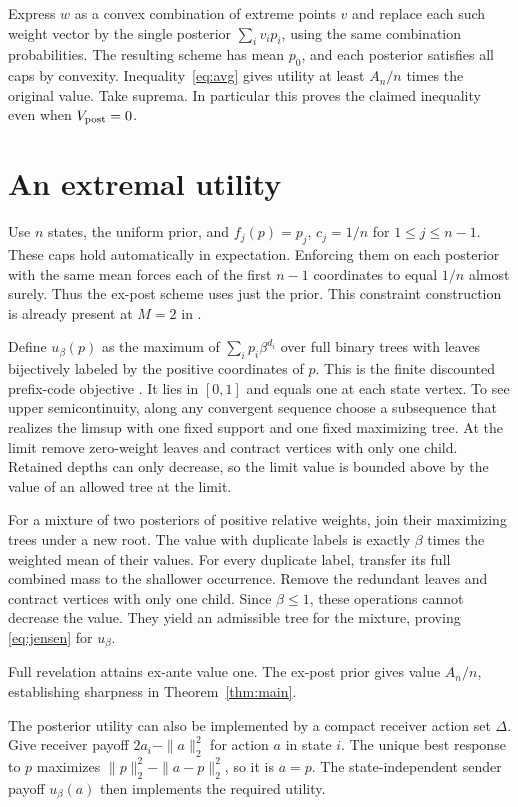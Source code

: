 \documentclass[11pt,a4paper]{amsart}
\begin{document}
Express \(w\) as a convex combination of extreme points \(v\) and replace each such weight vector by the single posterior \(\sum_i v_i p_i\), using the same combination probabilities. The resulting scheme has mean \(p_0\), and each posterior satisfies all caps by convexity. Inequality~\eqref{eq:avg} gives utility at least \(A_n/n\) times the original value. Take suprema. In particular this proves the claimed inequality even when \(V_{\rm post}=0\).

\section{An extremal utility}

Use \(n\) states, the uniform prior, and \(f_j(p)=p_j\), \(c_j=1/n\) for \(1\le j\le n-1\). These caps hold automatically in expectation. Enforcing them on each posterior with the same mean forces each of the first \(n-1\) coordinates to equal \(1/n\) almost surely. Thus the ex-post scheme uses just the prior. This constraint construction is already present at \(M=2\) in \cite[Prop.~5.5 and App.~E]{btzlong}.

Define \(u_\beta(p)\) as the maximum of \(\sum_i p_i\beta^{d_i}\) over full binary trees with leaves bijectively labeled by the positive coordinates of \(p\). This is the finite discounted prefix-code objective \cite{baer,parker}. It lies in \([0,1]\) and equals one at each state vertex. To see upper semicontinuity, along any convergent sequence choose a subsequence that realizes the limsup with one fixed support and one fixed maximizing tree. At the limit remove zero-weight leaves and contract vertices with only one child. Retained depths can only decrease, so the limit value is bounded above by the value of an allowed tree at the limit.

For a mixture of two posteriors of positive relative weights, join their maximizing trees under a new root. The value with duplicate labels is exactly \(\beta\) times the weighted mean of their values. For every duplicate label, transfer its full combined mass to the shallower occurrence. Remove the redundant leaves and contract vertices with only one child. Since \(\beta\le1\), these operations cannot decrease the value. They yield an admissible tree for the mixture, proving \eqref{eq:jensen} for \(u_\beta\).

Full revelation attains ex-ante value one. The ex-post prior gives value \(A_n/n\), establishing sharpness in Theorem~\ref{thm:main}.

The posterior utility can also be implemented by a compact receiver action set \(\Delta\). Give receiver payoff \(2a_i-\|a\|_2^2\) for action \(a\) in state \(i\). The unique best response to \(p\) maximizes \(\|p\|_2^2-\|a-p\|_2^2\), so it is \(a=p\). The state-independent sender payoff \(u_\beta(a)\) then implements the required utility.
\end{document}
